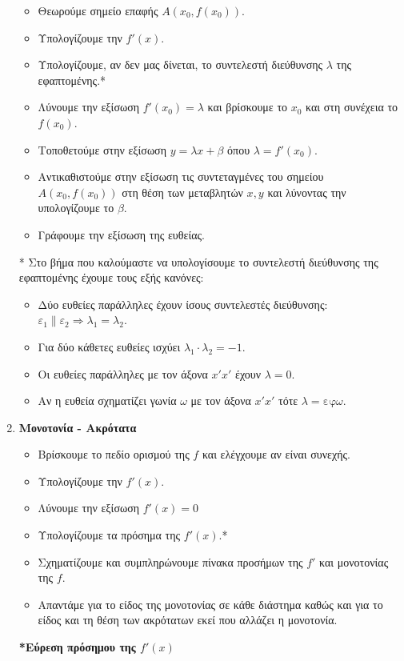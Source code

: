 \documentclass[a4paper,11pt]{article}
\newcommand{\ef}[1]{\textrm{εφ}#1}
\begin{document}
\begin{enumerate}[label=\bf\thesection.\arabic*.]
\begin{itemize}
\item Θεωρούμε σημείο επαφής $A(x_0,f(x_0))$.
\item Υπολογίζουμε την $f'(x)$.
\item Υπολογίζουμε, αν δεν μας δίνεται, το συντελεστή διεύθυνσης $\lambda$ της εφαπτομένης.*
\item Λύνουμε την εξίσωση $f'(x_0)=\lambda$ και βρίσκουμε το $x_0$ και στη συνέχεια το $f(x_0)$.
\item Τοποθετούμε στην εξίσωση $y=\lambda x+\beta$ όπου $\lambda=f'(x_0)$.
\item Αντικαθιστούμε στην εξίσωση τις συντεταγμένες του σημείου $A(x_0,f(x_0))$ στη θέση των μεταβλητών $x,y$ και λύνοντας την υπολογίζουμε το $\beta$.
\item Γράφουμε την εξίσωση της ευθείας.
\end{itemize}
* Στο βήμα που καλούμαστε να υπολογίσουμε το συντελεστή διεύθυνσης της εφαπτομένης έχουμε τους εξής κανόνες:
\begin{itemize}
\item Δύο ευθείες παράλληλες έχουν ίσους συντελεστές διεύθυνσης: $\varepsilon_1\parallel\varepsilon_2\Rightarrow\lambda_1=\lambda_2$.
\item Για δύο κάθετες ευθείες ισχύει $\lambda_1\cdot\lambda_2=-1$.
\item Οι ευθείες παράλληλες με τον άξονα $x'x'$ έχουν $\lambda=0$.
\item Αν η ευθεία σχηματίζει γωνία $\omega$ με τον άξονα $x'x'$ τότε $\lambda=\ef{\omega}$.
\end{itemize}
\newpage
\item\textbf{Μονοτονία - Ακρότατα}
\begin{itemize}
 \item Βρίσκουμε το πεδίο ορισμού της $f$ και ελέγχουμε αν είναι συνεχής.
\item Υπολογίζουμε την $f'(x)$.
\item Λύνουμε την εξίσωση $f'(x)=0$
\item Υπολογίζουμε τα πρόσημα της $f'(x)$.*
\item Σχηματίζουμε και συμπληρώνουμε πίνακα προσήμων της $f'$ και μονοτονίας της $f$.
\item Απαντάμε για το είδος της μονοτονίας σε κάθε διάστημα καθώς και για το είδος και τη θέση των ακρότατων εκεί που αλλάζει η μονοτονία.
\end{itemize}
\begin{center}
 \textbf{*Εύρεση πρόσημου της $f'(x)$}

\end{center}
\end{enumerate}
\end{document}
